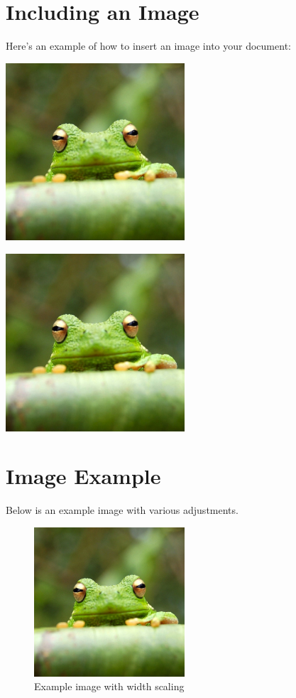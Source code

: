 \documentclass{article}
\begin{document}
\section{Including an Image}

Here’s an example of how to insert an image into your document:

\includegraphics[width=0.5\textwidth]{files/frog.jpg}

\includegraphics[width=0.5\textwidth, angle=45]{files/frog.jpg}

\section{Image Example}

Below is an example image with various adjustments.

\begin{figure}[ht] %
    \centering %
    \includegraphics[width=0.5\textwidth, angle=0]{files/frog.jpg}
    \caption{Example image with width scaling}
    \label{fig:example} %
\end{figure}
\end{document}
